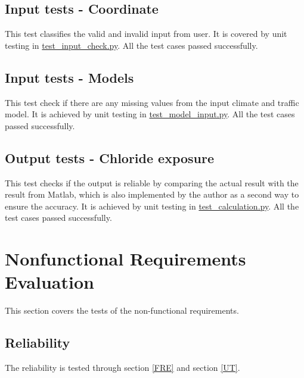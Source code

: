 \documentclass[12pt, titlepage]{article}
\begin{document}
\subsection{Input tests - Coordinate}
This test classifies the valid and invalid input from user. It is covered by unit testing in \href{https://github.com/CynthiaLiu0805/BridgeCorrosion/blob/main/src/app/test_input_check.py}{test\_input\_check.py}. All the test cases passed successfully. 


\subsection{Input tests - Models}
This test check if there are any missing values from the input climate and traffic model. It is achieved by unit testing in  \href{https://github.com/CynthiaLiu0805/BridgeCorrosion/blob/main/src/database/test_model_check.py}{test\_model\_input.py}. All the test cases passed successfully. 

\subsection{Output tests - Chloride exposure}
This test checks if the output is reliable by comparing the actual result with the result from Matlab, which is also implemented by the author as a second way to ensure the accuracy. It is achieved by unit testing in  \href{https://github.com/CynthiaLiu0805/BridgeCorrosion/blob/main/src/database/test_calculation.py}{test\_calculation.py}. All the test cases passed successfully. 

\section{Nonfunctional Requirements Evaluation}
This section covers the tests of the non-functional requirements. 
\subsection{Reliability}
The reliability is tested through section \ref{FRE} and section \ref{UT}.
\end{document}
